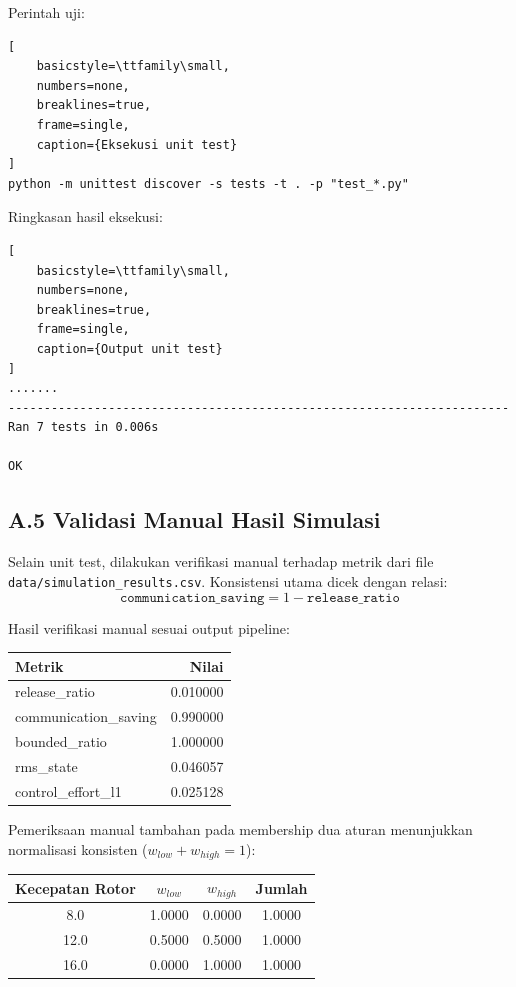 Perintah uji:
\begin{lstlisting}[
    basicstyle=\ttfamily\small,
    numbers=none,
    breaklines=true,
    frame=single,
    caption={Eksekusi unit test}
]
python -m unittest discover -s tests -t . -p "test_*.py"
\end{lstlisting}

Ringkasan hasil eksekusi:
\begin{lstlisting}[
    basicstyle=\ttfamily\small,
    numbers=none,
    breaklines=true,
    frame=single,
    caption={Output unit test}
]
.......
----------------------------------------------------------------------
Ran 7 tests in 0.006s

OK
\end{lstlisting}

\subsection*{A.5 Validasi Manual Hasil Simulasi}

Selain unit test, dilakukan verifikasi manual terhadap metrik dari file
\texttt{data/simulation\_results.csv}. Konsistensi utama dicek dengan relasi:
\[
\texttt{communication\_saving} = 1 - \texttt{release\_ratio}
\]

Hasil verifikasi manual sesuai output pipeline:

\begin{center}
\begin{tabular}{l r}
\toprule
\textbf{Metrik} & \textbf{Nilai} \\
\midrule
release\_ratio & 0.010000 \\
communication\_saving & 0.990000 \\
bounded\_ratio & 1.000000 \\
rms\_state & 0.046057 \\
control\_effort\_l1 & 0.025128 \\
\bottomrule
\end{tabular}
\end{center}

Pemeriksaan manual tambahan pada membership dua aturan menunjukkan normalisasi konsisten ($w_{low}+w_{high}=1$):

\begin{center}
\begin{tabular}{c c c c}
\toprule
\textbf{Kecepatan Rotor} & $w_{low}$ & $w_{high}$ & Jumlah \\
\midrule
8.0  & 1.0000 & 0.0000 & 1.0000 \\
12.0 & 0.5000 & 0.5000 & 1.0000 \\
16.0 & 0.0000 & 1.0000 & 1.0000 \\
\bottomrule
\end{tabular}
\end{center}

